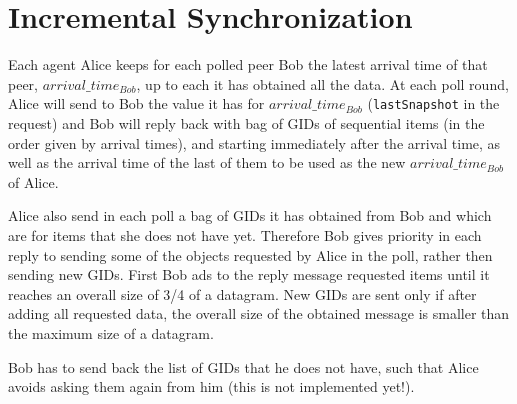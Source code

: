 \documentclass{book}
\newcommand{\mmb}[1]{{\tt #1}}
\begin{document}
\section{Incremental Synchronization}

Each agent Alice keeps for each polled peer Bob the latest arrival time of that peer, $arrival\_time_{Bob}$, up to each it has obtained all the data.
At each poll round, Alice will send to Bob the value it has for $arrival\_time_{Bob}$ (\mmb{lastSnapshot} in the request) and Bob will reply
back with bag of GIDs of sequential items (in the order given by arrival times), and starting immediately after the arrival time,
as well as the arrival time of the last of them to be used as the new $arrival\_time_{Bob}$ of Alice.

Alice also send in each poll a bag of GIDs it has obtained from Bob and which are for items that she does not have yet.
Therefore Bob gives priority in each reply to sending some of the objects requested by Alice in the poll, rather then 
sending new GIDs. First Bob ads to the reply message requested items until it reaches an overall size
of 3/4 of a datagram. 
New GIDs are sent only if after adding all requested data, the overall size of the obtained message is smaller than the maximum size of a datagram.

Bob has to send back the list of GIDs that he does not have, such that Alice avoids asking them again from him (this is not implemented yet!).
\end{document}
